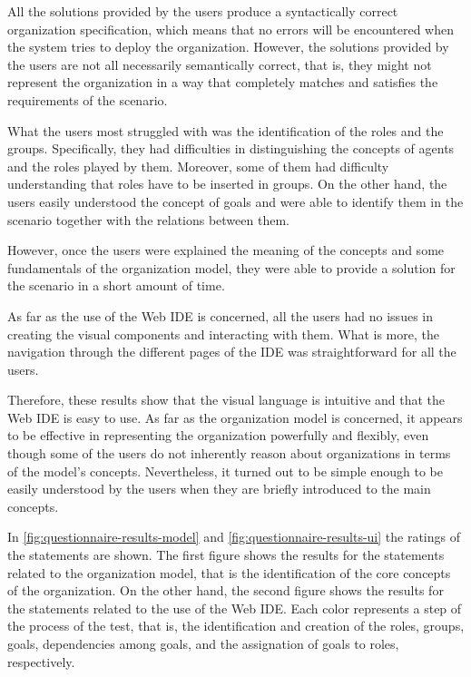 All the solutions provided by the users produce a syntactically correct organization specification, which means that no errors will be encountered when the system tries to deploy the organization.
However, the solutions provided by the users are not all necessarily semantically correct, that is, they might not represent the organization in a way that completely matches and satisfies the requirements of the scenario.

What the users most struggled with was the identification of the roles and the groups.
Specifically, they had difficulties in distinguishing the concepts of agents and the roles played by them.
Moreover, some of them had difficulty understanding that roles have to be inserted in groups.
On the other hand, the users easily understood the concept of goals and were able to identify them in the scenario together with the relations between them.

However, once the users were explained the meaning of the concepts and some fundamentals of the organization model, they were able to provide a solution for the scenario in a short amount of time.

As far as the use of the Web IDE is concerned, all the users had no issues in creating the visual components and interacting with them.
What is more, the navigation through the different pages of the IDE was straightforward for all the users.

Therefore, these results show that the visual language is intuitive and that the Web IDE is easy to use.
As far as the organization model is concerned, it appears to be effective in representing the organization powerfully and flexibly, even though some of the users do not inherently reason about organizations in terms of the model's concepts.
Nevertheless, it turned out to be simple enough to be easily understood by the users when they are briefly introduced to the main concepts.

In \cref{fig:questionnaire-results-model} and \cref{fig:questionnaire-results-ui} the ratings of the statements are shown.
The first figure shows the results for the statements related to the organization model, that is the identification of the core concepts of the organization.
On the other hand, the second figure shows the results for the statements related to the use of the Web IDE.
Each color represents a step of the process of the test, that is, the identification and creation of the roles, groups, goals, dependencies among goals, and the assignation of goals to roles, respectively.

